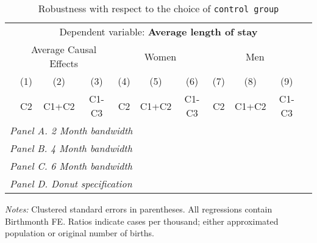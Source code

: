  \begin{table}[H] \begin{threeparttable} \centering \caption{Robustness with respect to the choice of \texttt{control group}} {\def\sym#1{\ifmmode^{#1}\else\(^{#1}\)\fi} \begin{tabular}{l*{10}{c}} \toprule & \multicolumn{9}{c}{Dependent variable: \textbf{Average length of stay}} \\ \cmidrule(lr){2-10}
            &\multicolumn{3}{c}{Average Causal Effects}&\multicolumn{3}{c}{Women}             &\multicolumn{3}{c}{Men}               \\\cmidrule(lr){2-4}\cmidrule(lr){5-7}\cmidrule(lr){8-10}
            &\multicolumn{1}{c}{(1)}&\multicolumn{1}{c}{(2)}&\multicolumn{1}{c}{(3)}&\multicolumn{1}{c}{(4)}&\multicolumn{1}{c}{(5)}&\multicolumn{1}{c}{(6)}&\multicolumn{1}{c}{(7)}&\multicolumn{1}{c}{(8)}&\multicolumn{1}{c}{(9)}\\
            &\multicolumn{1}{c}{C2}&\multicolumn{1}{c}{C1+C2}&\multicolumn{1}{c}{C1-C3}&\multicolumn{1}{c}{C2}&\multicolumn{1}{c}{C1+C2}&\multicolumn{1}{c}{C1-C3}&\multicolumn{1}{c}{C2}&\multicolumn{1}{c}{C1+C2}&\multicolumn{1}{c}{C1-C3}\\
\midrule
 \multicolumn{10}{l}{\emph{Panel A. 2 Month bandwidth}} \\  \midrule\multicolumn{10}{l}{\emph{Panel B. 4 Month bandwidth}} \\  \midrule\multicolumn{10}{l}{\emph{Panel C. 6 Month bandwidth}} \\  \midrule\multicolumn{10}{l}{\emph{Panel D. Donut specification}} \\  
\bottomrule \end{tabular} } \begin{tablenotes} \item \scriptsize \emph{Notes:} Clustered standard errors in parentheses. All regressions contain Birthmonth FE. Ratios indicate cases per thousand; either approximated population or original number of births. \end{tablenotes} \end{threeparttable} \end{table} 
